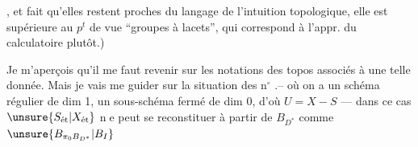 , et   fait qu'elles restent  proches du langage  de l'intuition topologique, elle est supérieure au $p^t$ de vue ``groupes à lacets'', qui correspond à l'appr. du calculatoire plutôt.)


Je m'aperçois qu'il me faut revenir sur les notations des   topos associés à une telle donnée. Mais je vais me guider sur la situation des n$^\circ$ .-- où on a un schéma régulier  de dim 1, un sous-schéma fermé  de dim 0, d'où $U=X-S$ --- dans ce cas  $\unsure{S_{\text{ét}}|X_{\text{ét}}}$ \textcircled{ne} peut se reconstituer à partir de $B_{D^*}$ comme $\unsure{B_{\pi_0 B_{D^*}}|B_I}$


